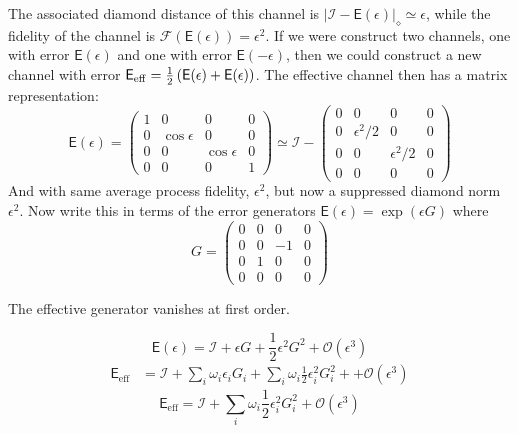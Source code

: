 \documentclass[aps,nofootinbib,pra,notitlepage,twocolumn]{revtex4-1}
\newcommand{\abs}[1]{\left\vert #1 \right\vert}
\newcommand{\error}{\ensuremath{{\mathsf{E}}}}
\begin{document}
The associated diamond distance of this channel is $\abs{\mathcal{I} - \error(\epsilon)}_\diamond \simeq \epsilon$, while the fidelity of the channel is $\mathcal{F}(\error(\epsilon)) = \epsilon^2$. If we were construct two channels, one with error $\error(\epsilon)$ and one with error $\error(-\epsilon)$, then we could construct a new channel with error $\error_{\rm eff} = \frac{1}{2}\left(\error(\epsilon) + \error(\epsilon)\right)$. The effective channel then has a matrix representation:
\begin{equation}
	\error(\epsilon) =
	\left(\begin{array}{ccccc}
		1 & 0 & 0 & 0 \\ 
		0 & \cos\epsilon & 0  & 0  \\
		0 & 0 & \cos\epsilon & 0  \\
		0 & 0 & 0 & 1
	\end{array} 	
	\right) \simeq \mathcal{I} - 
	\left(\begin{array}{ccccc}
		0 & 0 & 0 & 0 \\ 
		0 & \epsilon^2/2 & 0  & 0  \\
		0 & 0 & \epsilon^2/2 & 0  \\
		0 & 0 & 0 & 0
	\end{array} 	
	\right)
\end{equation}
And with same average process fidelity, $\epsilon^2$, but now a suppressed diamond norm $\epsilon^2$. Now write this in terms of the error generators $\error(\epsilon) = \exp(\epsilon G)$ where
\begin{equation}
	G =
	\left(\begin{array}{ccccc}
		0 & 0 & 0 & 0 \\ 
		0 & 0 & -1  & 0  \\
		0 & 1 & 0 & 0  \\
		0 & 0 & 0 & 0
	\end{array} 	
	\right)
\end{equation}

The effective generator vanishes at first order.

\begin{equation}
	\error(\epsilon) = \mathcal{I} + \epsilon G + \frac{1}{2}\epsilon^2 G^2 + \mathcal{O}(\epsilon^3)
\end{equation}
\begin{align}
	\error_{\text{eff}} 
		&= \mathcal{I} + \sum_i \omega_i \epsilon_i G_i+ \sum_i \omega_i \frac{1}{2}\epsilon^2_i G_i^2 + + \mathcal{O}(\epsilon^3)
\end{align}
\begin{equation}
	\error_{\text{eff}} = \mathcal{I} + \sum_i \omega_i \frac{1}{2}\epsilon^2_i G_i^2 + \mathcal{O}(\epsilon^3)
\end{equation}
\end{document}
